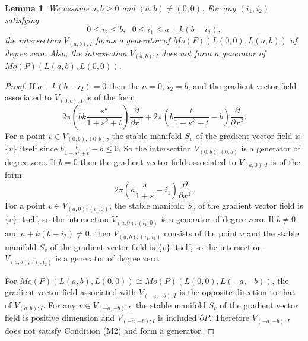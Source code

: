 \documentclass[12pt,reqno]{amsart}
\newcommand{\del}{{\partial}}
\newtheorem{lem}[thm]{Lemma}%
\theoremstyle{definition}
\begin{document}
\begin{lem}
We assume $a,b\geq0$ and $(a,b)\neq(0,0)$. For any $(i_1,i_2)$ satisfying
\begin{equation*}
0\leq i_2\leq b,\ \ \ 0\leq i_1\leq a+k(b-i_2),
\end{equation*}
the intersection $V_{(a,b);I}$ forms a generator of $Mo(P)(L(0,0),L(a,b))$ of degree zero. Also, the intersection $V_{(a,b);I}$ does not form a generator of $Mo(P)(L(a,b),L(0,0))$.
\end{lem}
\begin{proof}
If $a+k(b-i_2)=0$ then the $a=0$, $i_2=b$, and the gradient vector field associated to $V_{(0,b);I}$ is of the form
\begin{equation*}
2\pi\left(bk\frac{s^k}{1+s^k+t}\right)\frac{\del}{\del x^1} + 2\pi\left(b\frac{t}{1+s^k+t} - b \right)\frac{\del}{\del x^2}.
\end{equation*}
For a point $v\in V_{(0,b);(0,b)}$, the stable manifold $S_v$ of the gradient vector field is $\{v\}$ itself since $b\frac{t}{1+s^k+t} - b\leq0$. So the intersection $V_{(0,b);(0,b)}$ is a generator of degree zero. If $b=0$ then the gradient vector field associated to $V_{(a,0);I}$ is of the form 
\begin{equation*}
2\pi\left(a\frac{s}{1+s} - i_1\right)\frac{\del}{\del x^1}.
\end{equation*}
For a point $v\in V_{(a,0);(i_1,0)}$, the stable manifold $S_v$ of the gradient vector field is $\{v\}$ itself, so the intersection $V_{(a,0);(i_1,0)}$ is a generator of degree zero. If $b\neq0$ and $a+k(b-i_2)\neq0$, then $V_{(a,b);(i_1,i_2)}$ consists of the point $v$ and the stable manifold $S_v$ of the gradient vector field is $\{v\}$ itself, so the intersection $V_{(a,b);(i_1,i_2)}$ is a generator of degree zero. \par
For $Mo(P)(L(a,b),L(0,0))\cong Mo(P)(L(0,0),L(-a,-b))$, the gradient vector field associated with $V_{(-a,-b);I}$ is the opposite direction to that of $V_{(a,b);I}$. For any $v\in V_{(-a,-b);I}$, the stable manifold $S_v$ of the gradient vector field is positive dimension and $V_{(-a,-b);I}$ is included $\del P$. Therefore $V_{(-a,-b);I}$ does not satisfy Condition (M2) and form a generator.
\end{proof}
\end{document}
